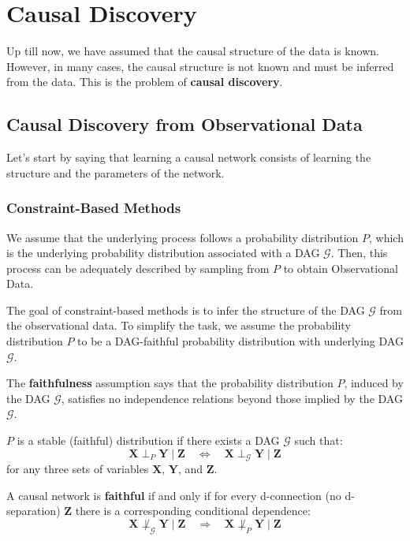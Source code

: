 \chapter{Causal Discovery}
Up till now, we have assumed that the causal structure of the data is known. However,
in many cases, the causal structure is not known and must be inferred from the data.
This is the problem of \textbf{causal discovery}.

\section{Causal Discovery from Observational Data}
Let's start by saying that learning a causal network consists of learning the
structure and the parameters of the network.
\subsection{Constraint-Based Methods}
We assume that the underlying process follows a probability distribution $P$, which
is the underlying probability distribution associated with a DAG $\mathcal{G}$.
Then, this process can be adequately described by sampling from $P$ to obtain
Observational Data.

The goal of constraint-based methods is to infer the structure of the DAG $\mathcal{G}$
from the observational data. To simplify the task, we assume the probability
distribution $P$ to be a DAG-faithful probability distribution with underlying
DAG $\mathcal{G}$.

The \textbf{faithfulness} assumption says that the probability distribution $P$,
induced by the DAG $\mathcal{G}$, satisfies no independence relations beyond
those implied by the DAG $\mathcal{G}$.

\begin{definition}
    $P$ is a stable (faithful) distribution if there exists a DAG $\mathcal{G}$
    such that:
    \begin{equation}
        \mathbf{X} \perp_{P} \mathbf{Y} \mid \mathbf{Z} \quad \iff \quad \mathbf{X} \perp_{\mathcal{G}} \mathbf{Y} \mid \mathbf{Z}
    \end{equation}
    for any three sets of variables $\mathbf{X}$, $\mathbf{Y}$, and $\mathbf{Z}$.
\end{definition}

A causal network is \textbf{faithful} if and only if for every d-connection (no
d-separation) $\mathbf{Z}$ there is a corresponding conditional dependence:
\begin{equation}
    \mathbf{X} \not\perp_{\mathcal{G}} \mathbf{Y} \mid \mathbf{Z} \quad \Rightarrow \quad \mathbf{X} \not\perp_{P} \mathbf{Y} \mid \mathbf{Z}
\end{equation}

